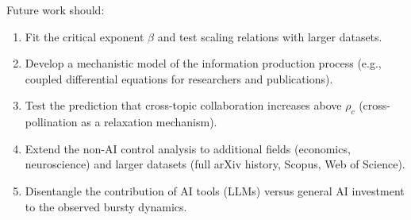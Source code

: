 \documentclass[12pt]{article}
\begin{document}
Future work should:
\begin{enumerate}
    \item Fit the critical exponent $\beta$ and test scaling relations with larger datasets.
    \item Develop a mechanistic model of the information production process (e.g., coupled differential equations for researchers and publications).
    \item Test the prediction that cross-topic collaboration increases above $\rho_c$ (cross-pollination as a relaxation mechanism).
    \item Extend the non-AI control analysis to additional fields (economics, neuroscience) and larger datasets (full arXiv history, Scopus, Web of Science).
    \item Disentangle the contribution of AI tools (LLMs) versus general AI investment to the observed bursty dynamics.
\end{enumerate}
\end{document}
